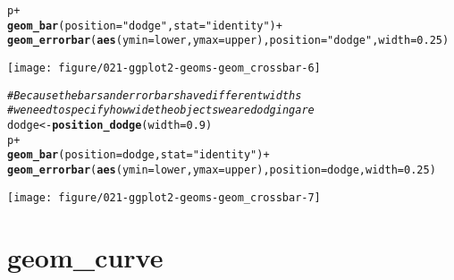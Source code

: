 \documentclass[a4paper,titlepage]{tufte-handout}\usepackage[]{graphicx}\usepackage[]{color}
\makeatletter
\def\maxwidth{ %
  \ifdim\Gin@nat@width>\linewidth
    \linewidth
  \else
    \Gin@nat@width
  \fi
}
\newcommand{\hlnum}[1]{\textcolor[rgb]{0.686,0.059,0.569}{#1}}%
\newcommand{\hlstr}[1]{\textcolor[rgb]{0.192,0.494,0.8}{#1}}%
\newcommand{\hlcom}[1]{\textcolor[rgb]{0.678,0.584,0.686}{\textit{#1}}}%
\newcommand{\hlopt}[1]{\textcolor[rgb]{0,0,0}{#1}}%
\newcommand{\hlstd}[1]{\textcolor[rgb]{0.345,0.345,0.345}{#1}}%
\newcommand{\hlkwb}[1]{\textcolor[rgb]{0.69,0.353,0.396}{#1}}%
\newcommand{\hlkwc}[1]{\textcolor[rgb]{0.333,0.667,0.333}{#1}}%
\newcommand{\hlkwd}[1]{\textcolor[rgb]{0.737,0.353,0.396}{\textbf{#1}}}%
\newenvironment{kframe}{%
 \def\at@end@of@kframe{}%
 \ifinner\ifhmode%
  \def\at@end@of@kframe{\end{minipage}}%
  \begin{minipage}{\columnwidth}%
 \fi\fi%
 \def\FrameCommand##1{\hskip\@totalleftmargin \hskip-\fboxsep
 \colorbox{shadecolor}{##1}\hskip-\fboxsep
     \hskip-\linewidth \hskip-\@totalleftmargin \hskip\columnwidth}%
 \MakeFramed {\advance\hsize-\width
   \@totalleftmargin\z@ \linewidth\hsize
   \@setminipage}}%
 {\par\unskip\endMakeFramed%
 \at@end@of@kframe}
\newenvironment{knitrout}{}{} %
\makeatother
\begin{document}
\begin{knitrout}
\begin{kframe}
\begin{alltt}
\hlstd{p} \hlopt{+}
 \hlkwd{geom_bar}\hlstd{(}\hlkwc{position} \hlstd{=} \hlstr{"dodge"}\hlstd{,} \hlkwc{stat} \hlstd{=} \hlstr{"identity"}\hlstd{)} \hlopt{+}
 \hlkwd{geom_errorbar}\hlstd{(}\hlkwd{aes}\hlstd{(}\hlkwc{ymin} \hlstd{= lower,} \hlkwc{ymax} \hlstd{= upper),} \hlkwc{position} \hlstd{=} \hlstr{"dodge"}\hlstd{,} \hlkwc{width} \hlstd{=} \hlnum{0.25}\hlstd{)}
\end{alltt}
\end{kframe}
\texttt{[image: figure/021-ggplot2-geoms-geom\_crossbar-6]} 
\begin{kframe}\begin{alltt}
\hlcom{# Because the bars and errorbars have different widths}
\hlcom{# we need to specify how wide the objects we are dodging are}
\hlstd{dodge} \hlkwb{<-} \hlkwd{position_dodge}\hlstd{(}\hlkwc{width}\hlstd{=}\hlnum{0.9}\hlstd{)}
\hlstd{p} \hlopt{+}
  \hlkwd{geom_bar}\hlstd{(}\hlkwc{position} \hlstd{= dodge,} \hlkwc{stat} \hlstd{=} \hlstr{"identity"}\hlstd{)} \hlopt{+}
  \hlkwd{geom_errorbar}\hlstd{(}\hlkwd{aes}\hlstd{(}\hlkwc{ymin} \hlstd{= lower,} \hlkwc{ymax} \hlstd{= upper),} \hlkwc{position} \hlstd{= dodge,} \hlkwc{width} \hlstd{=} \hlnum{0.25}\hlstd{)}
\end{alltt}
\end{kframe}
\texttt{[image: figure/021-ggplot2-geoms-geom\_crossbar-7]} 

\end{knitrout}


\section{geom\_curve}
\end{document}
